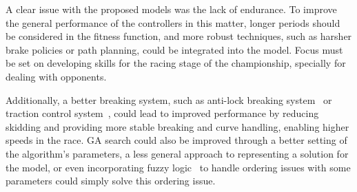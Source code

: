 

A clear issue with the proposed models was the lack of endurance. To improve the general performance of the controllers in this matter, longer periods should be considered in the fitness function, and more robust techniques, such as harsher brake policies or path planning, could be integrated into the model. Focus must be set on developing skills for the racing stage of the championship, specially for dealing with opponents.

Additionally, a better breaking system, such as anti-lock breaking system~\cite{5593318} or traction control system~\cite{5593318}, could lead to improved performance by reducing skidding and providing more stable breaking and curve handling, enabling higher speeds in the race. GA search could also be improved through a better setting of the algorithm's parameters, a less general approach to representing a solution for the model, or even incorporating fuzzy logic~\cite{DIEGO} to handle ordering issues with some parameters could simply solve this ordering issue.

